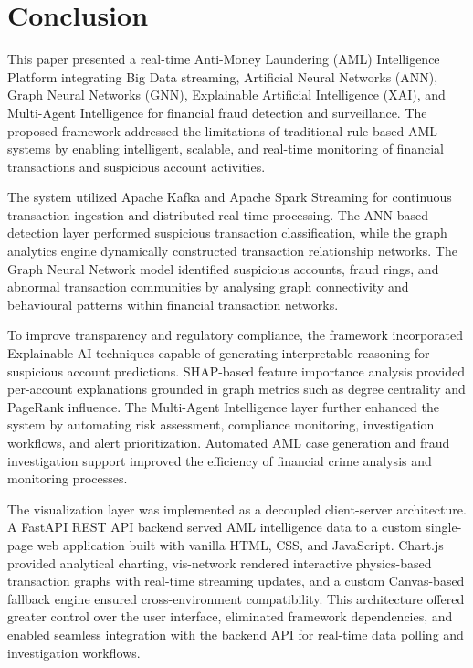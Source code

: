 \documentclass[conference]{IEEEtran}
\begin{document}
\clearpage
\section{Conclusion}

This paper presented a real-time Anti-Money Laundering (AML) Intelligence Platform integrating Big Data streaming, Artificial Neural Networks (ANN), Graph Neural Networks (GNN), Explainable Artificial Intelligence (XAI), and Multi-Agent Intelligence for financial fraud detection and surveillance. The proposed framework addressed the limitations of traditional rule-based AML systems by enabling intelligent, scalable, and real-time monitoring of financial transactions and suspicious account activities.

The system utilized Apache Kafka and Apache Spark Streaming for continuous transaction ingestion and distributed real-time processing. The ANN-based detection layer performed suspicious transaction classification, while the graph analytics engine dynamically constructed transaction relationship networks. The Graph Neural Network model identified suspicious accounts, fraud rings, and abnormal transaction communities by analysing graph connectivity and behavioural patterns within financial transaction networks.

To improve transparency and regulatory compliance, the framework incorporated Explainable AI techniques capable of generating interpretable reasoning for suspicious account predictions. SHAP-based feature importance analysis provided per-account explanations grounded in graph metrics such as degree centrality and PageRank influence. The Multi-Agent Intelligence layer further enhanced the system by automating risk assessment, compliance monitoring, investigation workflows, and alert prioritization. Automated AML case generation and fraud investigation support improved the efficiency of financial crime analysis and monitoring processes.

The visualization layer was implemented as a decoupled client-server architecture. A FastAPI REST API backend served AML intelligence data to a custom single-page web application built with vanilla HTML, CSS, and JavaScript. Chart.js provided analytical charting, vis-network rendered interactive physics-based transaction graphs with real-time streaming updates, and a custom Canvas-based fallback engine ensured cross-environment compatibility. This architecture offered greater control over the user interface, eliminated framework dependencies, and enabled seamless integration with the backend API for real-time data polling and investigation workflows.
\end{document}
